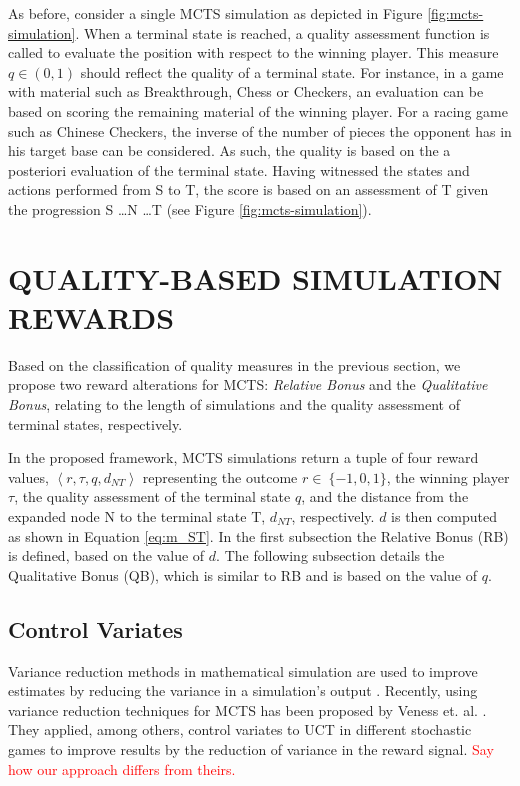 \documentclass{ecai2014}
\newcommand\todo[1]{\textcolor{red}{#1}}
\newcommand{\tuple}[1]{\ensuremath{\left \langle #1 \right \rangle }}
\newcommand{\node}[1]{{\fontfamily{phv}\selectfont#1}}
\begin{document}
As before, consider a single MCTS simulation as depicted in Figure \ref{fig:mcts-simulation}. When a terminal state is reached, a quality assessment function is called to evaluate the position with respect to the winning player. This measure $q \in (0, 1)$ should reflect the quality of a terminal state. For instance, in a game with material such as Breakthrough, Chess or Checkers, an evaluation can be based on scoring the remaining material of the winning player. For a racing game such as Chinese Checkers, the inverse of the number of pieces the opponent has in his target base can be considered. As such, the quality is based on the a posteriori evaluation of the terminal state. Having witnessed the states and actions performed from \node{S} to \node{T}, the score is based on an assessment of \node{T} given the progression \node{S} \ldots \node{N} \ldots \node{T} (see Figure \ref{fig:mcts-simulation}).

\section{QUALITY-BASED SIMULATION REWARDS}
\label{sec:qoreward}
Based on the classification of quality measures in the previous section, we propose two reward alterations for MCTS: \emph{Relative Bonus} and the \emph{Qualitative Bonus}, relating to the length of simulations and the quality assessment of terminal states, respectively. 

In the proposed framework, MCTS simulations return a tuple of four reward values, $\tuple{r,\tau,q,d_{NT}}$ representing the outcome $r\in~\{-1, 0, 1\}$, the winning player $\tau$, the quality assessment of the terminal state $q$, and the distance from the expanded node \node{N} to the terminal state \node{T}, $d_{NT}$, respectively. $d$ is then computed as shown in Equation \ref{eq:m_ST}. In the first subsection the Relative Bonus (RB) is defined, based on the value of $d$. The following subsection details the Qualitative Bonus (QB), which is similar to RB and is based on the value of $q$.

\subsection{Control Variates}
Variance reduction methods in mathematical simulation are used to improve estimates by reducing the variance in a simulation's output \cite{kelton2000simulation}. Recently, using variance reduction techniques for MCTS has been proposed by Veness et. al. \cite{Veness11variance}. They applied, among others, control variates to UCT in different stochastic games to improve results by the reduction of variance in the reward signal. \todo{Say how our approach differs from theirs.}
\end{document}
